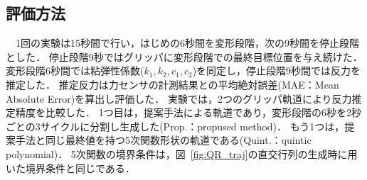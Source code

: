 \documentclass[a4paper]{jarticle}
\begin{document}
\subsection{評価方法}
　1回の実験は15秒間で行い，はじめの6秒間を変形段階，次の9秒間を停止段階とした．
停止段階9秒ではグリッパに変形段階での最終目標位置を与え続けた．
変形段階6秒間では粘弾性係数($k_1, k_2, c_1, c_2$)を同定し，停止段階9秒間では反力を推定した．
推定反力は力センサの計測結果との平均絶対誤差(MAE：Mean Absolute Error)を算出し評価した．
実験では，2つのグリッパ軌道により反力推定精度を比較した．
1つ目は，提案手法による軌道であり，変形段階の6秒を2秒ごとの3サイクルに分割し生成した(Prop.：propused method)．
もう1つは，提案手法と同じ最終値を持つ5次関数形状の軌道である(Quint.：quintic polynomial)．
5次関数の境界条件は，図~{\ref{fig:QR_traj}}の直交行列の生成時に用いた境界条件と同じである．
\end{document}
